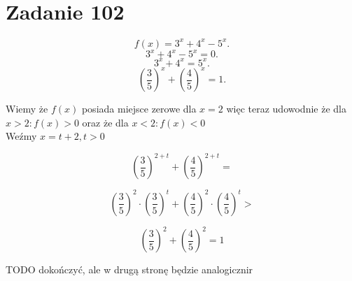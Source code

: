 \documentclass[a4paper,12pt]{article}
\begin{document}
\section*{Zadanie 102}
\[
  f(x) = 3^{x} + 4^{x} - 5^{x}
.\] 
\[
  3^{x} + 4^{x} - 5^{x} = 0 
.\] 
\[
  3^{x} + 4^{x} = 5^{x}
.\] 
\[
  \left(\frac{3}{5}\right)^{x} + \left(\frac{4}{5}\right)^{x} = 1
.\] 

Wiemy że $f(x)$ posiada miejsce zerowe dla $x = 2$ więc teraz udowodnie
że dla $x > 2: f(x) > 0$ oraz że dla $x < 2: f(x) < 0 $ \\
Weźmy $x = t + 2, t > 0$

\[
  \left(\frac{3}{5}\right)^{2 + t} + \left(\frac{4}{5}\right)^{2 + t} =
\]


\[
  \left(\frac{3}{5}\right)^{2} \cdot \left(\frac{3}{5}\right)^{t} +
    \left(\frac{4}{5}\right)^{2} \cdot \left(\frac{4}{5}\right)^{t} >
\]

\[
  \left(\frac{3}{5}\right)^{2} + \left(\frac{4}{5}\right)^{2} = 1
\]

TODO dokończyć, ale w drugą stronę będzie analogicznir
\end{document}
